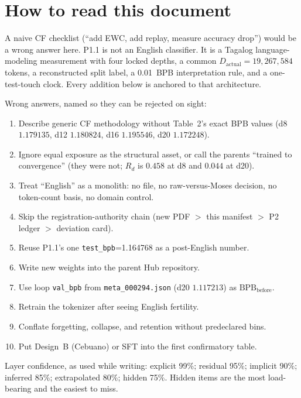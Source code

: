 \documentclass[11pt,a4paper]{article}
\begin{document}
\tableofcontents

\section{How to read this document}
\label{sec:howto}

A naive CF checklist (``add EWC, add replay, measure accuracy drop'') would be a wrong answer here. P1.1 is not an English classifier. It is a Tagalog language-modeling measurement with four locked depths, a common $D_{\mathrm{actual}}=19{,}267{,}584$ tokens, a reconstructed split label, a 0.01~BPB interpretation rule, and a one-test-touch clock. Every addition below is anchored to that architecture.

Wrong answers, named so they can be rejected on sight:

\begin{enumerate}
\item Describe generic CF methodology without Table~2's exact BPB values (d8 $1.179135$, d12 $1.180824$, d16 $1.195546$, d20 $1.172248$).
\item Ignore equal exposure as the structural asset, or call the parents ``trained to convergence'' (they were not; $R_d$ is $0.458$ at d8 and $0.044$ at d20).
\item Treat ``English'' as a monolith: no file, no raw-versus-Moses decision, no token-count basis, no domain control.
\item Skip the registration-authority chain (new PDF $>$ this manifest $>$ P2 ledger $>$ deviation card).
\item Reuse P1.1's one \texttt{test\_bpb}=1.164768 as a post-English number.
\item Write new weights into the parent Hub repository.
\item Use loop \texttt{val\_bpb} from \texttt{meta\_000294.json} (d20 $1.117213$) as $\mathrm{BPB}_{\mathrm{before}}$.
\item Retrain the tokenizer after seeing English fertility.
\item Conflate forgetting, collapse, and retention without predeclared bins.
\item Put Design~B (Cebuano) or SFT into the first confirmatory table.
\end{enumerate}

Layer confidence, as used while writing: explicit 99\%; residual 95\%; implicit 90\%; inferred 85\%; extrapolated 80\%; hidden 75\%. Hidden items are the most load-bearing and the easiest to miss.
\end{document}
